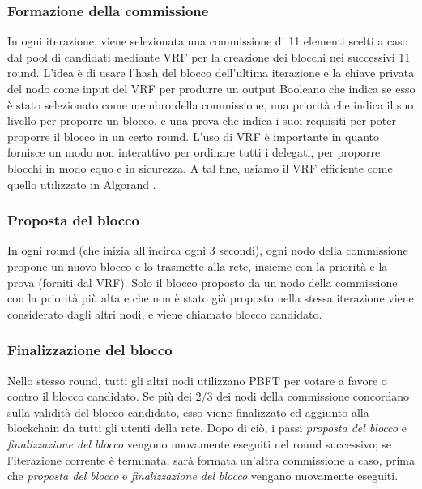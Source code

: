 \subsubsection{Formazione della commissione}
In ogni iterazione, viene selezionata una commissione di 11 elementi scelti a caso dal pool di candidati mediante VRF per la creazione dei blocchi nei successivi 11 round. L'idea è di usare l'hash del blocco dell'ultima iterazione e la chiave privata del nodo come input del VRF per produrre un output Booleano che indica se esso è stato selezionato come membro della commissione, una priorità che indica il suo livello per proporre un blocco, e una prova che indica i suoi requisiti per poter proporre il blocco in un certo round. L'uso di VRF è importante in quanto fornisce un modo non interattivo per ordinare tutti i delegati, per proporre blocchi in modo equo e in sicurezza. A tal fine, usiamo il VRF efficiente come quello utilizzato in Algorand \cite{c12}.

\subsubsection{Proposta del blocco}
In ogni round (che inizia all'incirca ogni 3 secondi), ogni nodo della commissione propone un nuovo blocco e lo trasmette alla rete, insieme con la priorità e la prova (forniti dal VRF). Solo il blocco proposto da un nodo della commissione con la priorità più alta e che non è stato già proposto nella stessa iterazione viene considerato dagli altri nodi, e viene chiamato blocco candidato.

\subsubsection{Finalizzazione del blocco}
Nello stesso round, tutti gli altri nodi utilizzano PBFT per votare a favore o contro il blocco candidato. Se più dei 2/3 dei nodi della commissione concordano sulla validità del blocco candidato, esso viene finalizzato ed aggiunto alla blockchain da tutti gli utenti della rete. Dopo di ciò, i passi \emph{proposta del blocco} e \emph{finalizzazione del blocco} vengono nuovamente eseguiti nel round successivo; se l'iterazione corrente è terminata, sarà formata un'altra commissione a caso, prima che \emph{proposta del blocco} e \emph{finalizzazione del blocco} vengano nuovamente eseguiti.

